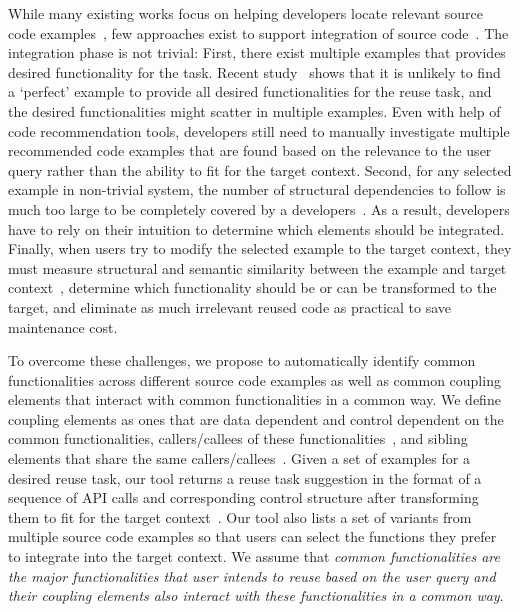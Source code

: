 \documentclass{sig-alternate}
\begin{document}
While many existing works focus on helping developers locate relevant source code examples~\cite{Holmes:structural05, Xie:ParseWeb07, Xsnippet:OOPSLA06, sniff:Sen09, Denys:portfolio11, Mandelin:jungloid05}, few approaches exist to support integration of source code~\cite{Cottrell:jigsaw08}. The integration phase is not trivial:  First, there exist multiple examples that provides desired functionality for the task. Recent study~\cite{Holmes:reuseStudy09} shows that it is unlikely to find a `perfect' example to provide all desired functionalities for the reuse task, and the desired functionalities might scatter in multiple examples. Even with help of code recommendation tools, developers still need to manually investigate multiple recommended code examples that are found based on the relevance to the user query rather than the ability to fit for the target context. Second, for any selected example in non-trivial system, the number of structural dependencies to follow is much too large to be completely covered by a developers~\cite{Holmes:ASE09}.  As a result, developers have to  rely on their intuition to determine which elements should be  integrated. Finally, when users try to modify the selected example to the target context, they must measure structural and semantic similarity between the example and target context~\cite{Cottrell:jigsaw08}, determine which functionality should be or can be transformed to the target, and eliminate as much irrelevant reused code as practical to save maintenance cost. %

To overcome these challenges, we propose to automatically identify common functionalities across different source code examples as well as common coupling elements that interact with common functionalities in a common way. We define coupling elements as ones that are data dependent and control dependent on the common functionalities, callers/callees of these functionalities~\cite{Robillard:FSE05},  and sibling elements that share the same callers/callees~\cite{Devanbu:randomWalk07}. Given a set of examples for a desired reuse task, our tool returns a reuse task suggestion in the format of a sequence of API calls and corresponding control structure after transforming them to fit for the target context~\cite{Cottrell:jigsaw08}. Our tool also lists a set of variants from multiple source code examples so that users can select the functions they prefer to integrate into the target context. We assume that \textit{common functionalities are the major functionalities that user intends to reuse based on the user query and their coupling elements also interact with these functionalities in a common way}.
\end{document}
